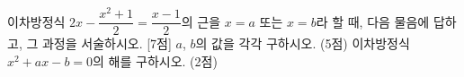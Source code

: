 이차방정식 $2x-\dfrac{x^2+1}{2}=\dfrac{x-1}{2}$의 근을 $x=a$ 또는 $x=b$라 할 때, 다음 물음에 답하고, 그 과정을 서술하시오.  \mbox{[7점]}
 $a$, $b$의 값을 각각 구하시오. (5점)
 이차방정식 $x^2+ax-b=0$의 해를 구하시오. (2점)
